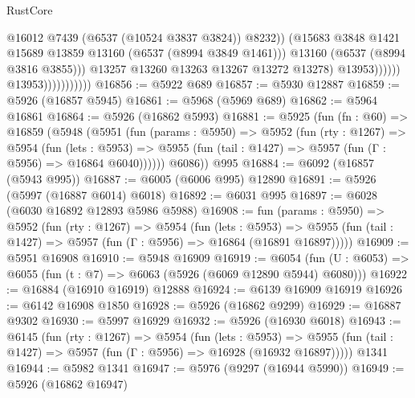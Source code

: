 \begin{lexlean}{RustCore}
\begin{coremodule}
                                              @16012
                                              @7439
                                              (@6537 (@10524 @3837 @3824))
                                              @8232))
                                          (@15683
                                            @3848
                                            @1421
                                            @15689
                                            @13859
                                            @13160
                                            (@6537 (@8994 @3849 @1461)))
                                          @13160
                                          (@6537 (@8994 @3816 @3855)))
                                        @13257
                                        @13260
                                        @13263
                                        @13267
                                        @13272
                                        @13278)
                                      @13953))))))
                          @13953)))))))))))
@16856 := @5922 @689
@16857 := @5930 @12887
@16859 := @5926 (@16857 @5945)
@16861 := @5968 (@5969 @689)
@16862 := @5964 @16861
@16864 := @5926 (@16862 @5993)
@16881 := @5925
    (fun (fn : @60) =>
    @16859
      (@5948
        (@5951
          (fun (params : @5950) =>
          @5952
            (fun (rty : @1267) =>
            @5954
              (fun (lets : @5953) =>
              @5955 (fun (tail : @1427) => @5957 (fun (Γ : @5956) => @16864 @6040))))))
        @6086))
    @995
@16884 := @6092 (@16857 (@5943 @995))
@16887 := @6005 (@6006 @995) @12890
@16891 := @5926 (@5997 (@16887 @6014) @6018)
@16892 := @6031 @995
@16897 := @6028 (@6030 @16892 @12893 @5986 @5988)
@16908 := fun (params : @5950) =>
  @5952
    (fun (rty : @1267) =>
    @5954
      (fun (lets : @5953) =>
      @5955 (fun (tail : @1427) => @5957 (fun (Γ : @5956) => @16864 (@16891 @16897)))))
@16909 := @5951 @16908
@16910 := @5948 @16909
@16919 := @6054
    (fun (U : @6053) => @6055 (fun (t : @7) => @6063 (@5926 (@6069 @12890 @5944) @6080)))
@16922 := @16884 (@16910 @16919) @12888
@16924 := @6139 @16909 @16919
@16926 := @6142 @16908 @1850
@16928 := @5926 (@16862 @9299)
@16929 := @16887 @9302
@16930 := @5997 @16929
@16932 := @5926 (@16930 @6018)
@16943 := @6145
    (fun (rty : @1267) =>
    @5954
      (fun (lets : @5953) =>
      @5955 (fun (tail : @1427) => @5957 (fun (Γ : @5956) => @16928 (@16932 @16897)))))
    @1341
@16944 := @5982 @1341
@16947 := @5976 (@9297 (@16944 @5990))
@16949 := @5926 (@16862 @16947)

\end{coremodule}
\end{lexlean}
